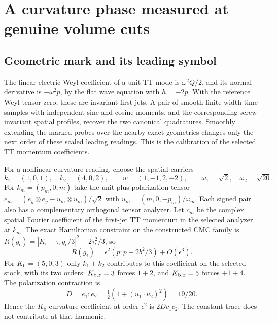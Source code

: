 \section{A curvature phase measured at genuine volume cuts}\label{sec:detector}

\subsection{Geometric mark and its leading symbol}

The linear electric Weyl coefficient of a unit TT mode is \(\omega^2 Q/2\), and its normal derivative is \(-\omega^2p\), by the flat wave equation with \(\dot h=-2p\). With the reference Weyl tensor zero, these are invariant first jets. A pair of smooth finite-width time samples with independent sine and cosine moments, and the corresponding screw-invariant spatial profiles, recover the two canonical quadratures. Smoothly extending the marked probes over the nearby exact geometries changes only the next order of these scaled leading readings. This is the calibration of the selected TT momentum coefficients.

For a nonlinear curvature reading, choose the spatial carriers
\[
    k_1=(1,0,1),\quad k_2=(4,0,2),\qquad
    w=(1,-1,2,-2),\qquad \omega_1=\sqrt2,\quad\omega_2=\sqrt{20}.
\]
For \(k_m=(p_m,0,m)\) take the unit plus-polarization tensor
\(e_m=(e_y\otimes e_y-u_m\otimes u_m)/\sqrt2\) with
\(u_m=(m,0,-p_m)/\omega_m\). Each signed pair also has a complementary orthogonal tensor analyzer. Let \(c_m\) be the complex spatial Fourier coefficient of the first-jet TT momentum in the selected analyzer at \(k_m\). The exact Hamiltonian constraint on the constructed CMC family is
\(R(g_\epsilon)=|K_\epsilon-\tau_\epsilon g_\epsilon/3|^2-2\tau_\epsilon^2/3\), so
\[
             R(g_\epsilon)
                  =\epsilon^2(p:p-2b^2/3)+O(\epsilon^3).
\]
For \(K_{\mathrm b}=(5,0,3)\) only \(k_1+k_2\) contributes to this coefficient on the selected stock, with its two orders: \(K_{{\rm b},z}=3\) forces \(1+2\), and \(K_{{\rm b},x}=5\) forces \(+1+4\). The polarization contraction is
\[
       D=e_1:e_2=\tfrac12(1+(u_1\cdot u_2)^2)=19/20.
\]
Hence the \(K_{\mathrm b}\) curvature coefficient at order \(\epsilon^2\) is \(2D c_1c_2\). The constant trace does not contribute at that harmonic.

